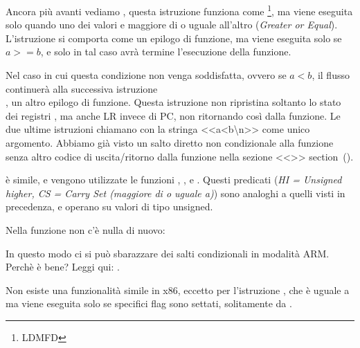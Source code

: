 
Ancora più avanti vediamo , questa istruzione funziona come \footnote{\ac{LDMFD}},
ma viene eseguita solo quando uno dei valori e maggiore di o uguale all'altro (\emph{Greater or Equal}).
L'istruzione  si comporta come un epilogo di funzione, ma viene eseguita solo se $a>=b$, e solo in tal caso avrà termine l'esecuzione della funzione.


Nel caso in cui questa condizione non venga soddisfatta, ovvero se $a<b$, il flusso continuerà alla successiva istruzione \\
 , un altro epilogo di funzione. Questa istruzione non ripristina soltanto lo stato dei registri  , ma anche \ac{LR} invece di \ac{PC}, non ritornando così dalla funzione.
Le due ultime istruzioni chiamano \printf con la stringa <<a<b\textbackslash{}n>> come unico argomento.
Abbiamo già visto un salto diretto non condizionale alla funzione \printf senza altro codice di uscita/ritorno dalla funzione nella sezione <<\PrintfSeveralArgumentsSectionName>> section~().

 è simile, e vengono utilizzate le funzioni , , e . Questi predicati (\emph{HI = Unsigned higher, CS = Carry Set (maggiore di o uguale a)}) sono analoghi a quelli visti in precedenza, e operano su valori di tipo unsigned.

Nella funzione \main non c'è nulla di nuovo:



In questo modo ci si può sbarazzare dei salti condizionali in modalità ARM.
Perchè è bene? Leggi qui: .


Non esiste una funzionalità simile in x86, eccetto per l'istruzione  , che è uguale a \MOV ma viene eseguita solo
se specifici flag sono settati, solitamente da \CMP.

\mysubparagraph{\OptimizingKeilVI (\ThumbMode)}



